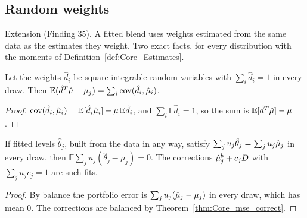 \subsection*{Random weights}

Extension (Finding 35). A fitted blend uses weights estimated from the same data as the
estimates they weight. Two exact facts, for every distribution with the moments of
Definition~\ref{def:Core_Estimates}.

\begin{theorem}\label{thm:Core_randomLin_bias}
  \leanok
  Let the weights $\hat d_i$ be square-integrable random variables with
  $\sum_i \hat d_i = 1$ in every draw. Then
  $\mathbb E(\hat d^T\hat\mu - \mu_j) = \sum_i \operatorname{cov}(\hat d_i, \hat\mu_i)$.
\end{theorem}
\begin{proof}
  \leanok
  $\operatorname{cov}(\hat d_i, \hat\mu_i) = \mathbb E[\hat d_i\hat\mu_i] - \mu\,\mathbb E\hat d_i$, and
  $\sum_i \mathbb E\hat d_i = 1$, so the sum is $\mathbb E[\hat d^T\hat\mu] - \mu$.
\end{proof}

\begin{theorem}\label{thm:Core_balanced_unbiased}
  \leanok
  If fitted levels $\hat\theta_j$, built from the data in any way, satisfy
  $\sum_j u_j\hat\theta_j = \sum_j u_j\hat\mu_j$ in every draw, then
  $\mathbb E\sum_j u_j(\hat\theta_j - \mu_j) = 0$. The corrections $\hat\mu_j^b + c_jD$ with
  $\sum_j u_jc_j = 1$ are such fits.
\end{theorem}
\begin{proof}
  \leanok
  By balance the portfolio error is $\sum_j u_j(\hat\mu_j - \mu_j)$ in every draw, which has
  mean $0$. The corrections are balanced by Theorem~\ref{thm:Core_mse_correct}.
\end{proof}

